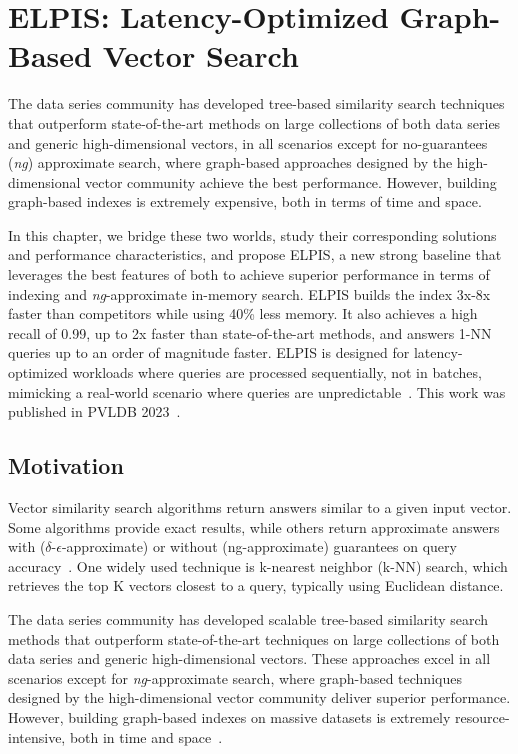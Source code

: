 \graphicspath{{../img/graph/}}
\chapter{ELPIS: Latency-Optimized Graph-Based Vector Search}
\label{chapter:elpis}

The data series community has developed tree-based similarity search techniques that outperform state-of-the-art methods on large collections of both data series and generic high-dimensional vectors, in all scenarios except for no-guarantees (\textit{ng}) approximate search, where graph-based approaches designed by the high-dimensional vector community achieve the best performance. However, building graph-based indexes is extremely expensive, both in terms of time and space.

In this chapter, we bridge these two worlds, study their corresponding solutions and performance characteristics, and propose ELPIS, a new strong baseline that leverages the best features of both to achieve superior performance in terms of indexing and \textit{ng}-approximate in-memory search. ELPIS builds the index 3x-8x faster than competitors while using 40\% less memory. It also achieves a high recall of 0.99, up to 2x faster than state-of-the-art methods, and answers 1-NN queries up to an order of magnitude faster. ELPIS is designed for latency-optimized workloads where queries are processed sequentially, not in batches, mimicking a real-world scenario where queries are unpredictable~\cite{itsawreport,DBLP:conf/edbt/GogolouTPB19,conf/sigmod/gogolou20}. This work was published in PVLDB 2023~\cite{elpis}.

\clearpage

\section{Motivation}
Vector similarity search algorithms return answers similar to a given input vector. Some algorithms provide exact results, while others return approximate answers with (\(\delta\)-\(\epsilon\)-approximate) or without (ng-approximate) guarantees on query accuracy~\cite{hydra1,hydra2}. One widely used technique is k-nearest neighbor (k-NN) search, which retrieves the top K vectors closest to a query, typically using Euclidean distance.

The data series community has developed scalable tree-based similarity search methods that outperform state-of-the-art techniques on large collections of both data series and generic high-dimensional vectors. These approaches excel in all scenarios except for \textit{ng}-approximate search, where graph-based techniques designed by the high-dimensional vector community deliver superior performance. However, building graph-based indexes on massive datasets is extremely resource-intensive, both in time and space~\cite{hydra2,neurips-2021-ann-competition,graph-survey-vldb}.

